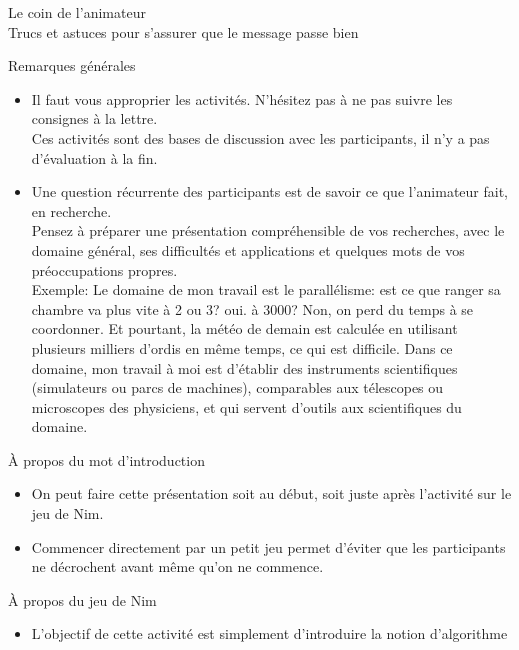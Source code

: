 \documentclass[final,hyperref={pdfpagelabels=false}]{beamer}
\renewcommand*{\footnotesize}{\fontsize{\resultfootnotesizeX}{\resultfootnotesizeY}\selectfont}
\renewcommand*{\large}{\fontsize{\resultlargeX}{\resultlargeY}\selectfont}
\begin{document}
\begin{frame}{Le coin de l'animateur\\[-5pt]
  {\large Trucs et astuces pour s'assurer que le message passe bien}}
  \begin{block}{Remarques générales}
    \begin{itemize}
    \item Il faut vous approprier les activités. N'hésitez pas à ne pas suivre
      les consignes à la lettre.\\
      Ces activités sont des bases de discussion avec les participants, il n'y
      a pas d'évaluation à la fin.
    \item Une question récurrente des participants est de savoir ce que
      l'animateur fait, en recherche.\\
      Pensez à préparer une présentation compréhensible de vos recherches, avec
      le domaine général, ses difficultés et applications et quelques mots de
      vos préoccupations propres.\\
      {\footnotesize Exemple: Le domaine de mon travail est le parallélisme:
        est ce que ranger sa chambre va plus vite à 2 ou 3? oui. à 3000? Non,
        on perd du temps à se coordonner. Et pourtant, la météo de demain est
        calculée en utilisant plusieurs milliers d'ordis en même temps, ce qui
        est difficile. Dans ce domaine, mon travail à moi est d'établir des
        instruments scientifiques (simulateurs ou parcs de machines),
        comparables aux télescopes ou microscopes des physiciens, et qui
        servent d'outils aux scientifiques du domaine.}
    \end{itemize}
  \end{block}
  \begin{block}{À propos du mot d'introduction}
    \begin{itemize}
    \item On peut faire cette présentation soit au début, soit juste après
      l'activité sur le jeu de Nim.
    \item Commencer directement par un petit jeu permet d'éviter que les
      participants ne décrochent avant même qu'on ne commence.
    \end{itemize}
  \end{block}
  \begin{block}{À propos du jeu de Nim}
    \begin{itemize}
    \item L'objectif de cette activité est simplement d'introduire la notion d'algorithme

\end{itemize}
\end{block}
\end{frame}
\end{document}
